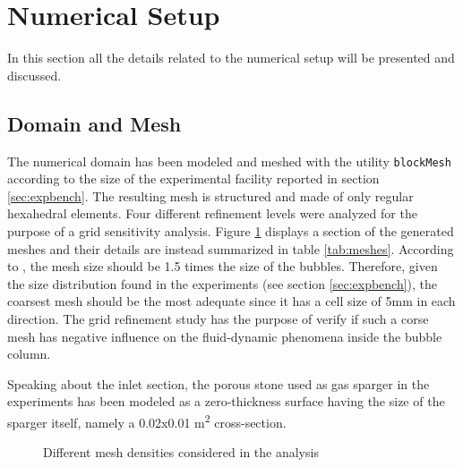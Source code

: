\documentclass[11pt,a4paper]{article}
\begin{document}
\section{Numerical Setup}
\label{sec:numsetup}
In this section all the details related to the numerical setup will be presented and discussed.




\subsection{Domain and Mesh}
\label{sub:domain}
The numerical domain has been modeled and meshed with the utility \texttt{blockMesh} according to the size of the experimental facility reported in section \ref{sec:expbench}. The resulting mesh is structured and made of only regular hexahedral elements. Four different refinement levels were analyzed for the purpose of a grid sensitivity analysis. Figure \ref{fig:mesh} displays a section of the generated meshes and their details are instead summarized in table \ref{tab:meshes}. According to \cite{krepper}, the mesh size should be 1.5 times the size of the bubbles. Therefore, given the size distribution found in the experiments (see section \ref{sec:expbench}),  the coarsest mesh should be the most adequate since it has a cell size of 5mm in each direction. The grid refinement study has the purpose of verify if such a corse mesh has  negative influence on the fluid-dynamic phenomena inside the bubble column.
 
Speaking about the inlet section, the porous stone used as gas sparger in the experiments has been modeled as a zero-thickness surface having the size of the sparger itself, namely a 0.02x0.01 m\textsuperscript{2} cross-section.


\begin{figure}[H]
    \centering
    \caption[]{Different mesh densities considered in the analysis}
    \label{fig:mesh} 
\end{figure}
\end{document}
